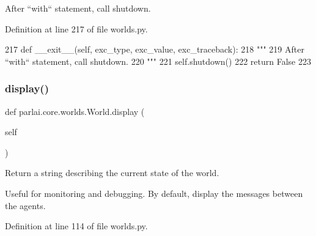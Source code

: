 \begin{DoxyVerb}After ``with`` statement, call shutdown.
\end{DoxyVerb}
 

Definition at line 217 of file worlds.\+py.


\begin{DoxyCode}
217     \textcolor{keyword}{def }\_\_exit\_\_(self, exc\_type, exc\_value, exc\_traceback):
218         \textcolor{stringliteral}{"""}
219 \textcolor{stringliteral}{        After ``with`` statement, call shutdown.}
220 \textcolor{stringliteral}{        """}
221         self.shutdown()
222         \textcolor{keywordflow}{return} \textcolor{keyword}{False}
223 
\end{DoxyCode}
\mbox{\label{classparlai_1_1core_1_1worlds_1_1World_a147371097765449933ca963215eba603}} 
\subsubsection{\texorpdfstring{display()}{display()}}
{\footnotesize\ttfamily def parlai.\+core.\+worlds.\+World.\+display (\begin{DoxyParamCaption}\item[{}]{self }\end{DoxyParamCaption})}

\begin{DoxyVerb}Return a string describing the current state of the world.

Useful for monitoring and debugging. By default, display the messages between
the agents.
\end{DoxyVerb}
 

Definition at line 114 of file worlds.\+py.


